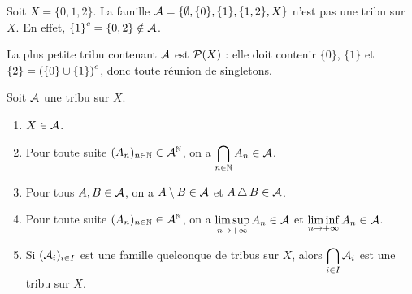 \documentclass[11pt]{article}
\begin{document}
\begin{exemple}
Soit $X = \{0,1,2\}$. La famille $\mathcal{A} = \{\emptyset, \{0\}, \{1\}, \{1,2\}, X\}$ n'est pas une tribu sur $X$. En effet, ${\{1\}}^{c} = \{0,2\} \notin \mathcal{A}$.

La plus petite tribu contenant $\mathcal{A}$ est $\mathcal{P}(X)$ : elle doit contenir $\{0\}$, $\{1\}$ et $\{2\} = {(\{0\}\cup\{1\})}^{c}$, donc toute réunion de singletons.
\end{exemple}

\begin{proposition}\label{prop:stabilite}
Soit $\mathcal{A}$ une tribu sur $X$.
\begin{enumerate}[label=\roman*)]
  \item $X \in \mathcal{A}$.
  \item Pour toute suite $(A_n)_{n\in\mathbb{N}} \in \mathcal{A}^{\mathbb{N}}$, on a $\displaystyle\bigcap_{n\in\mathbb{N}} A_n \in \mathcal{A}$.
  \item Pour tous $A, B \in \mathcal{A}$, on a $A \setminus B \in \mathcal{A}$ et $A \,\triangle\, B \in \mathcal{A}$.
  \item Pour toute suite $(A_n)_{n\in\mathbb{N}} \in \mathcal{A}^{\mathbb{N}}$, on a $\displaystyle\limsup_{n\to+\infty} A_n \in \mathcal{A}$ et $\displaystyle\liminf_{n\to+\infty} A_n \in \mathcal{A}$.
  \item Si $(\mathcal{A}_i)_{i\in I}$ est une famille quelconque de tribus sur $X$, alors $\displaystyle\bigcap_{i\in I}\mathcal{A}_i$ est une tribu sur $X$.
\end{enumerate}
\end{proposition}
\end{document}
